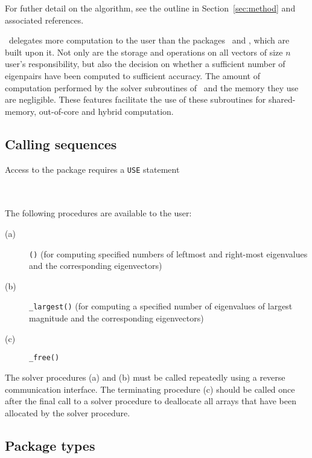 For futher detail on the algorithm, see the outline in Section~\ref{sec:method}
and associated references.

\fullpackagename\ delegates 
more computation to the user than the packages
\simple\ and \advanced, which are built upon it.
Not only are the storage and operations on all vectors of size $n$
user's responsibility, but also
the decision on 
whether a sufficient number of eigenpairs have been computed
to sufficient accuracy.
The amount of computation performed by 
the solver subroutines of \fullpackagename\
and the memory they use are negligible. 
These features facilitate the use of these subroutines
for shared-memory, out-of-core and hybrid computation.

\subsection{Calling sequences}

\label{sec:call}

Access to the package requires a {\tt USE} statement \\ \\
\indent\hspace{8mm}{\tt use \fullpackagename} \\

\medskip

\noindent The following procedures are available to the user:
%
\vspace{-0.1cm}
\begin{description}
\item[(a)] {\tt \solver()} 
(for computing specified numbers %
of leftmost and right-most
eigenvalues and the corresponding eigen\-vec\-tors)
\item[(b)] {\tt \solver\_largest()} 
(for computing a specified number %
of eigenvalues of largest magnitude
and the cor\-res\-pon\-ding eigenvectors)
\item[(c)] {\tt \solver\_free()} 
%
\end{description}

\noindent
The solver procedures (a) and (b)
must be called repeatedly using
a reverse communication interface.
The terminating procedure (c)
should be called once after the
final call to 
a solver procedure
to deallocate all arrays 
that have been allocated by
the solver procedure.

\subsection{Package types} 

